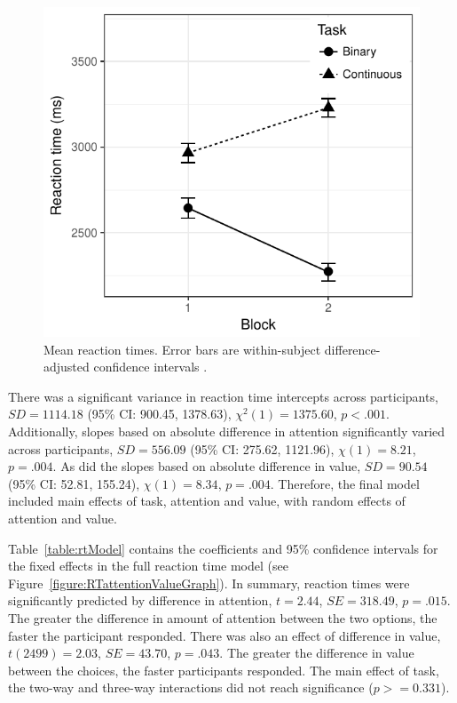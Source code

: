 \documentclass[12pt]{article}
\begin{document}
\begin{figure}
	\centering
	\includegraphics{images/RTorderEffects.pdf}
	\caption{Mean reaction times. Error bars are within-subject difference-adjusted confidence intervals \protect\cite{Baguley2012}.}
	\label{figure:RTblockGraph}
\end{figure}

There was a significant variance in reaction time intercepts across participants, $SD=1114.18$ (95\% CI: 900.45, 1378.63), $\chi^2(1)=1375.60$, $p<.001$. Additionally, slopes based on absolute difference in attention significantly varied across participants, $SD=556.09$ (95\% CI: 275.62, 1121.96), $\chi(1)=8.21$, $p=.004$. As did the slopes based on absolute difference in value, $SD=90.54$ (95\% CI: 52.81, 155.24), $\chi(1)=8.34$, $p=.004$. Therefore, the final model included main effects of task, attention and value, with random effects of attention and value. 
	


Table~\ref{table:rtModel} contains the coefficients and 95\% confidence intervals for the fixed effects in the full reaction time model (see Figure~\ref{figure:RTattentionValueGraph}). In summary, reaction times were significantly predicted by difference in attention, $t=2.44$, $SE=318.49$, $p=.015$. The greater the difference in amount of attention between the two options, the faster the participant responded. There was also an effect of difference in value, $t(2499)=2.03$, $SE=43.70$, $p=.043$. The greater the difference in value between the choices, the faster participants responded. The main effect of task, the two-way and three-way interactions did not reach significance ($p>=0.331$). 
\end{document}
